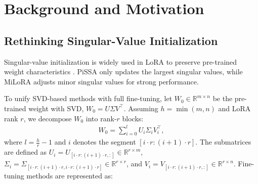 

\section{Background and Motivation}

\subsection{Rethinking Singular-Value Initialization}   \label{sec:svd}





Singular-value initialization is widely used in LoRA to preserve pre-trained weight characteristics \cite{zhao2024galorememoryefficientllmtraining, meng2024pissa, wang2024kasaknowledgeawaresingularvalueadaptation, lu2024twinmerging}. PiSSA \cite{meng2024pissa} only updates the largest singular values, while MiLoRA \cite{wang2024miloraharnessingminorsingular} adjusts minor singular values for strong performance.

To unify SVD-based methods with full fine-tuning, let \( W_0 \in \mathbb{R}^{m \times n} \) be the pre-trained weight with SVD, \( W_0 = U \Sigma V^\top \). Assuming \( h = \min(m, n) \) and LoRA rank \( r \), we decompose \( W_0 \) into rank-\( r \) blocks:
\begin{align}
W_0 = \sum_{i=0}^{l} U_i \Sigma_i V_i^\top,
\end{align}
where \( l = \frac{h}{r} - 1 \) and \( i \) denotes the segment \( [i \cdot r : (i+1) \cdot r] \). The submatrices are defined as \( U_i = U_{[i \cdot r : (i+1) \cdot r, :]} \in \mathbb{R}^{r \times m} \), \( \Sigma_i = \Sigma_{[i \cdot r : (i+1) \cdot r, i \cdot r : (i+1) \cdot r]} \in \mathbb{R}^{r \times r} \), and \( V_i = V_{[i \cdot r : (i+1) \cdot r, :]} \in \mathbb{R}^{r \times n} \).
Fine-tuning methods are represented as:

